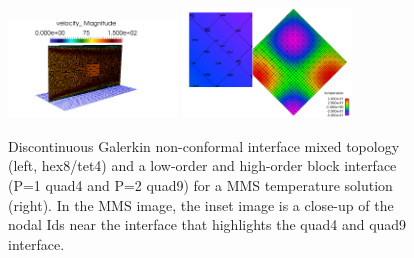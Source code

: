 \begin{figure}[h!tp]
\centering
\includegraphics[clip,width=0.4\textwidth]{images/dgHex8Tet4Duct.png}
\includegraphics[clip,width=0.4\textwidth]{images/dgQuad4Quad9MMS.png}
\caption{Discontinuous Galerkin non-conformal interface mixed topology (left, hex8/tet4) and a low-order and high-order block interface 
(P=1 quad4 and P=2 quad9) for a MMS temperature solution (right). In the MMS image, the inset image is a close-up of the nodal 
Ids near the interface that highlights the quad4 and quad9 interface.}
\label{dgMixMatch}
\end{figure}
